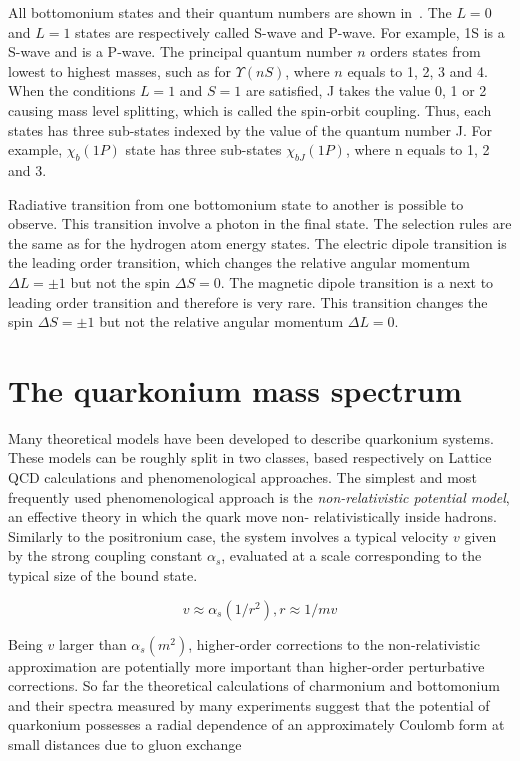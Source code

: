 



All bottomonium states and their quantum numbers are shown
in~. The $L = 0$ and $L = 1$ states are respectively
called S-wave and P-wave. For example, \Y1S is a S-wave and \chiboneOneP is a
P-wave. The principal quantum number $n$ orders states from lowest to highest
masses, such as for $\Upsilon(nS)$, where $n$ equals to 1, 2, 3 and 4. When the
conditions $L = 1$ and $S = 1$ are satisfied, J takes the value 0, 1 or 2
causing mass level splitting, which is called the spin-orbit coupling. Thus,
each \chib states has three sub-states indexed by the value of the quantum
number J. For example, $\chi_b(1P)$ state has three sub-states $\chi_{bJ}(1P)$,
where n equals to 1, 2 and 3.

Radiative transition from one bottomonium state to another is possible to
observe. This transition involve a photon in the final state. The selection
rules are the same as for the hydrogen atom energy states. The electric dipole
transition is the leading order transition, which changes the relative angular
momentum $\Delta L  = \pm 1$ but not the spin $\Delta S = 0$. The magnetic
dipole transition is a next to leading order transition and therefore is very
rare. This transition changes the spin $\Delta S = \pm 1$ but not the relative
angular momentum $\Delta L = 0$.

\section{The quarkonium mass spectrum}

Many theoretical models have been developed to describe quarkonium systems.
These models can be roughly split in two classes, based respectively on Lattice
QCD calculations and phenomenological approaches. The simplest and most
frequently used phenomenological approach is the {\it non-relativistic potential model}, an effective theory in which the quark move non-
relativistically inside hadrons. Similarly to the positronium case, the system
involves a typical velocity $v$ given by the strong coupling constant
$\alpha_s$, evaluated at a scale corresponding to the typical size of the
bound state.

\begin{equation}
v \approx \alpha_s(1/r^2), r \approx 1/mv
\end{equation}

Being $v$ larger than $\alpha_s(m^2)$, higher-order corrections to the 
non-relativistic approximation are potentially more important than higher-order
perturbative corrections. So far the theoretical calculations of charmonium and
bottomonium and their spectra measured by many experiments suggest that the
potential of quarkonium possesses a radial dependence of an approximately
Coulomb form at small distances due to gluon exchange

